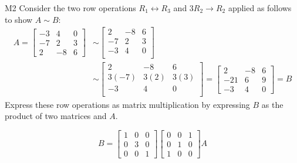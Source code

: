 \begin{problem}{M2}
Consider the two row operations 
\(R_1\leftrightarrow R_3\) and \(3 R_2\to R_2\)
applied as follows to show \(A\sim B\):
\begin{align*}
A
  =
\begin{bmatrix}
-3&4&0\\
-7&2&3\\
2&-8&6
\end{bmatrix}
  &\sim
\begin{bmatrix}
2&-8&6\\
-7&2&3\\
-3&4&0\\
\end{bmatrix}
  \\&\sim
\begin{bmatrix}
2&-8&6\\
3(-7)&3(2)&3(3)\\
-3&4&0\\
\end{bmatrix}
  =
\begin{bmatrix}
2&-8&6\\
-21&6&9\\
-3&4&0
\end{bmatrix}
  =
B
\end{align*}
Express these row operations as matrix multiplication
by expressing \(B\) as the product of two matrices and \(A\).
\end{problem}
\begin{solution}
\[
B
  =
\begin{bmatrix}
  1&0&0\\
  0&3&0\\
  0&0&1
\end{bmatrix}
\begin{bmatrix}
  0&0&1\\
  0&1&0\\
  1&0&0
\end{bmatrix}
A
\]
\end{solution}

